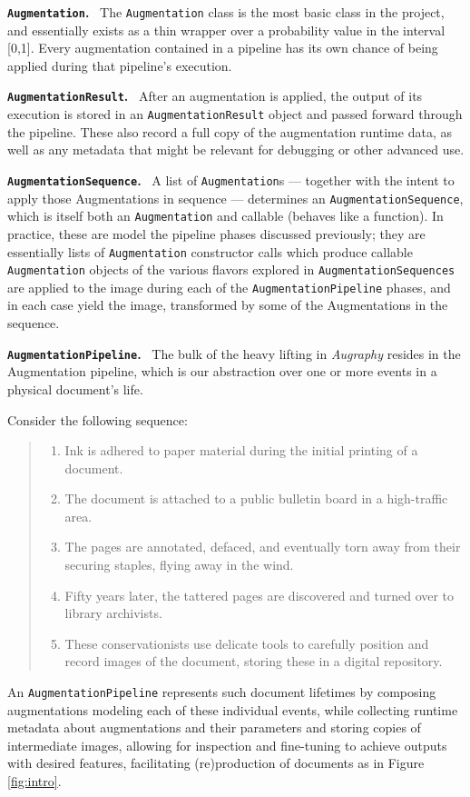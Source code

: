 \documentclass[runningheads]{llncs}
\begin{document}
\smallskip
\noindent\textbf{\texttt{Augmentation}.} ~The \texttt{Augmentation} class is the most basic class in the project, and essentially exists as a thin wrapper over a probability value in the interval [0,1].
Every augmentation contained in a pipeline has its own chance of being applied during that pipeline's execution.

\smallskip
\noindent\textbf{\texttt{AugmentationResult}.} ~After an augmentation is applied, the output of its execution is stored in an \texttt{AugmentationResult} object and passed forward through the pipeline.
These also record a full copy of the augmentation runtime data, as well as any metadata that might be relevant for debugging or other advanced use.

\smallskip
\noindent\textbf{\texttt{AugmentationSequence}.} ~A list of \texttt{Augmentation}s --- together with the intent to apply those Augmentations in sequence --- determines an \texttt{AugmentationSequence}, which is itself both an \texttt{Augmentation} and callable (behaves like a function).
In practice, these are model the pipeline phases discussed previously; they are essentially lists of \texttt{Augmentation} constructor calls which produce callable \texttt{Augmentation} objects of the various flavors explored in \texttt{AugmentationSequences} are applied to the image during each of the \texttt{AugmentationPipeline} phases, and in each case yield the image, transformed by some of the Augmentations in the sequence.

\smallskip
\noindent\textbf{\texttt{AugmentationPipeline}.} ~The bulk of the heavy lifting in \emph{Augraphy} resides in the Augmentation pipeline, which is our abstraction over one or more events in a physical document's life.

Consider the following sequence:
\begin{quote}
  \begin{enumerate}
  \item Ink is adhered to paper material during the initial printing of a document.
  \item The document is attached to a public bulletin board in a high-traffic area.
  \item The pages are annotated, defaced, and eventually torn away from their securing staples, flying away in the wind.
  \item Fifty years later, the tattered pages are discovered and turned over to library archivists.
  \item These conservationists use delicate tools to carefully position and record images of the document, storing these in a digital repository.
  \end{enumerate}
\end{quote}
An \texttt{AugmentationPipeline} represents such document lifetimes by composing augmentations modeling each of these individual events, while collecting runtime metadata about augmentations and their parameters and storing copies of intermediate images, allowing for inspection and fine-tuning to achieve outputs with desired features, facilitating (re)production of documents as in Figure \ref{fig:intro}.
\end{document}
